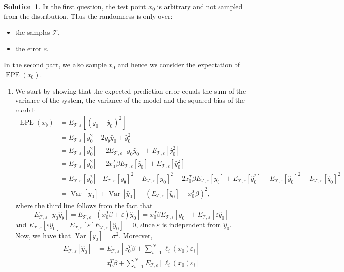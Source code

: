 \documentclass[]{book}
\theoremstyle{definition}
\newtheorem*{soln}{Solution}
\newcommand{\TT}{\mathcal{T}}
\DeclareMathOperator*{\EPE}{EPE} \DeclareMathOperator*{\Var}{Var}
\begin{document}
\begin{enumerate}
	\begin{soln}
		{ \newcommand{\Exp}{E_{\TT,\varepsilon}} In the first question, the test
			point $x_0$ is arbitrary and not sampled from the distribution. Thus
			the randomness is only over:
			\begin{itemize}
				\item the samples $\TT$,
				\item the error $\varepsilon$.
			\end{itemize}
			In the second part, we also sample $x_0$ and hence we consider the
			expectation of $\EPE(x_0)$.
			\begin{enumerate}
				\item We start by showing that the expected prediction error
				      equals the sum of the variance of the system, the variance
				      of the model and the squared bias of the model:
				      \begin{equation*}
					      \begin{split}
						      \EPE(x_0) &= \Exp[(y_0-\hat y_0)^2] \\
						      &= \Exp[y_0^2-2y_0\hat y_0 + \hat y_0^2] \\
						      &= \Exp[y_0^2]-2\Exp[y_0\hat y_0] + \Exp[\hat y_0^2] \\
						      &= \Exp[y_0^2]-2x_0^T\beta\Exp[\hat y_0] + \Exp[\hat y_0^2] \\
						      &= \Exp[y_0^2]\boxed{-\Exp[y_0]^2+\Exp[y_0]^2}-2x_0^T\beta\Exp[\hat y_0] + \Exp[\hat y_0^2] - \boxed{\Exp[\hat y_0]^2 + \Exp[\hat y_0]^2} \\
						      &= \Var[y_0] + \Var[\hat y_0] + \left(\Exp[\hat y_0]-x_0^T\beta\right)^2,
					      \end{split}
				      \end{equation*}
				      where the third line follows from the fact that
				      \[\Exp[y_0\hat y_0]=\Exp[(x_0^T\beta+\varepsilon)\hat
						      y_0]=x_0^T\beta\Exp[\hat y_0]+\Exp[\varepsilon\hat
						      y_0]\] and $\Exp[\varepsilon\hat
						      y_0]=\Exp[\varepsilon]\Exp[\hat y_0]=0$, since
				      $\varepsilon$ is independent from $\hat y_0$. Now,
				      we have that $\Var[y_0]=\sigma^2$. Moreover,
				      \begin{equation}
					      \begin{split}
						      \Exp[\hat y_0] &= \Exp\left[x_0^T\beta + \sum_{i-1}^N\ell_i(x_0)\varepsilon_i\right] \\
						      &= x_0^T\beta + \sum_{i-1}^N\Exp[\ell_i(x_0)\varepsilon_i] \\

\end{split}
\end{equation}
\end{enumerate}}
\end{soln}
\end{enumerate}
\end{document}
